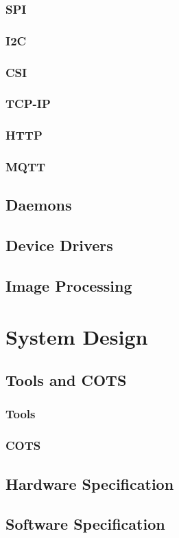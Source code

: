 \documentclass[12pt, letterpaper]{report}
\begin{document}
\subsection{SPI}
\subsection{I2C}

\subsection{CSI}

\subsection{TCP-IP}
\subsection{HTTP}
\subsection{MQTT}

\section{Daemons}
\section{Device Drivers}
\section{Image Processing}

\chapter{System Design}
\section{Tools and COTS}
\subsection{Tools}
\subsection{COTS}

\clearpage
\section{Hardware Specification}


\clearpage
\section{Software Specification}


\end{document}
